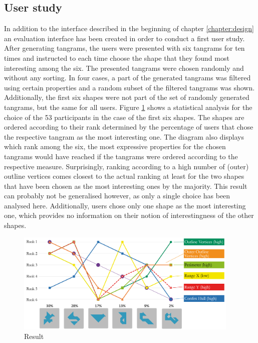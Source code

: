 \subsection{User study}

In addition to the interface described in the beginning of chapter \ref{chapter:design} an evaluation interface has been created in order to conduct a first user study. After generating tangrams, the users were presented with six tangrams for ten times and instructed to each time choose the shape that they found most interesting among the six. The presented tangrams were chosen randomly and without any sorting. In four cases, a part of the generated tangrams was filtered using certain properties and a random subset of the filtered tangrams was shown. Additionally, the first six shapes were not part of the set of randomly generated tangrams, but the same for all users. Figure \ref{result} shows a statistical analysis for the choice of the 53 participants in the case of the first six shapes. The shapes are ordered according to their rank determined by the percentage of users that chose the respective tangram as the most interesting one. The diagram also displays which rank among the six, the most expressive properties for the chosen tangrams would have reached if the tangrams were ordered according to the respective measure. Surprisingly, ranking according to a high number of (outer) outline vertices comes closest to the actual ranking at least for the two shapes that have been chosen as the most interesting ones by the majority. This result can probably not be generalised however, as only a single choice has been analysed here. Additionally, users chose only one shape as the most interesting one, which provides no information on their notion of interestingness of the other shapes.

\begin{figure}
\centering
    \includegraphics[width=0.95\textwidth]{figures/diagram.png}
  \caption{Result }  
  \label{result}
\end{figure}
